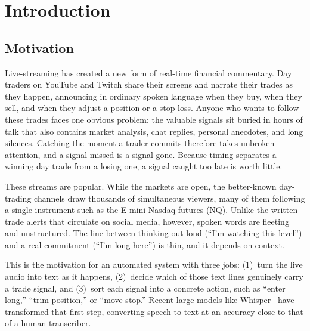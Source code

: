 \section{Introduction}
\label{sec:introduction}

\subsection{Motivation}
\label{sec:motivation}

Live-streaming has created a new form of real-time financial commentary. Day traders on YouTube and Twitch share their screens and narrate their trades as they happen, announcing in ordinary spoken language when they buy, when they sell, and when they adjust a position or a stop-loss. Anyone who wants to follow these trades faces one obvious problem: the valuable signals sit buried in hours of talk that also contains market analysis, chat replies, personal anecdotes, and long silences. Catching the moment a trader commits therefore takes unbroken attention, and a signal missed is a signal gone. Because timing separates a winning day trade from a losing one, a signal caught too late is worth little.

These streams are popular. While the markets are open, the better-known day-trading channels draw thousands of simultaneous viewers, many of them following a single instrument such as the E-mini Nasdaq futures (NQ). Unlike the written trade alerts that circulate on social media, however, spoken words are fleeting and unstructured. The line between thinking out loud (``I'm watching this level'') and a real commitment (``I'm long here'') is thin, and it depends on context.

This is the motivation for an automated system with three jobs: (1)~turn the live audio into text as it happens, (2)~decide which of those text lines genuinely carry a trade signal, and (3)~sort each signal into a concrete action, such as ``enter long,'' ``trim position,'' or ``move stop.'' Recent large models like Whisper~\cite{radford2023whisper} have transformed that first step, converting speech to text at an accuracy close to that of a human transcriber.

